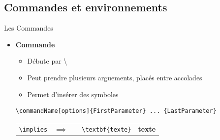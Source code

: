 \subsection{Commandes et environnements}
\begin{frame}[fragile]{Les Commandes}
  \begin{itemize}
  \item \textbf{Commande}
      \begin{itemize}
      \item Débute par \textbackslash
      \item Peut prendre plusieurs arguements, placés entre accolades
      \item Permet d'insérer des symboles
      \end{itemize}
      \begin{lstlisting}[style=nonumbers]
  \commandName[options]{FirstParameter} ... {LastParameter}
      \end{lstlisting}
      \begin{center}
      \begin{tabular}{lllll}
      \lstinline|\implies| & $\implies$ & & \lstinline|\textbf{texte}| & \textbf{texte}
      \end{tabular}
      \end{center}
  \end{itemize}
\end{frame}

